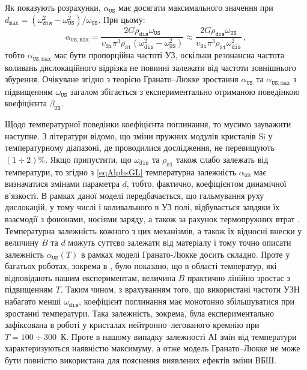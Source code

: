 Як показують розрахунки, $\alpha_\mathtt{US}$ має досягати максимального значення при
$d_\mathtt{max}=(\omega_\mathtt{dis}^2 - \omega_\mathtt{US}^2)/\omega_\mathtt{US}$.
При цьому:
\begin{equation}
\label{eqAlGLmax}
\alpha_\mathtt{US,max}=\frac{2G\rho_\mathtt{dis}\omega_\mathtt{US}}{\upsilon_\mathtt{Si}\pi^3\rho_\mathtt{Si}(\omega_\mathtt{dis}^2-\omega_\mathtt{US}^2)}
\approx\frac{2G\rho_\mathtt{dis}\omega_\mathtt{US}}{\upsilon_\mathtt{Si}\pi^3\rho_\mathtt{Si}\omega_\mathtt{dis}^2}\,,
\end{equation}
тобто $\alpha_\mathtt{US,max}$ має бути пропорційна частоті УЗ,
оскільки резонансна частота коливань дислокаційного відрізка не повинні залежати від частоти зовнішнього збурення.
Очікуване згідно з теорією Гранато--Люкке зростання $\alpha_\mathtt{US}$ та $\alpha_\mathtt{US,max}$ з підвищенням $\omega_\mathtt{US}$ загалом
збігається з експериментально отриманою поведінкою коефіцієнта $\beta_\mathtt{US}$.

Щодо температурної поведінки коефіцієнта поглинання, то мусимо зауважити наступне.
З літератури \cite{Si_C:Temp} відомо, що зміни пружних модулів кристалів Si у температурному діапазоні, де проводилися дослідження, не перевищують $(1\div2)\%$.
Якщо припустити, що $\omega_\mathtt{dis}$ та $\rho_\mathtt{Si}$ також слабо залежать від температури, то згідно з \eqref{eqAlphsGL} температурна залежність $\alpha_\mathtt{US}$ має визначатися змінами параметра $d$, тобто, фактично, коефіцієнтом динамічної в'язкості.
В рамках даної моделі передбачається, що гальмування руху дислокацій, у тому числі і коливального в УЗ полі,
відбувається завдяки їх взаємодії з фононами, носіями заряду, а також за рахунок термопружних втрат \cite{Granato,Sudz,True}.
Температурна залежність кожного з цих механізмів, а також їх відносні внески у величину $B$ та $d$ можуть суттєво залежати від матеріалу і тому точно описати залежність $\alpha_\mathtt{US}(T)$ в рамках моделі Гранато-Люкке досить складно.
Проте у багатьох роботах, зокрема в \cite{True}, було показано, що в області  температур,
які відповідають нашим експериментам, величина $B$ практично лінійно зростає з підвищенням $T$.
Таким чином, з врахуванням того, що використані частоти УЗН набагато менші $\omega_\mathtt{dis}$, коефіцієнт поглинання має монотонно збільшуватися при зростанні температури.
Така залежність, зокрема, була експериментально зафіксована в роботі \cite{YOlikh:USadsorb} у кристалах нейтронно--легованого кремнію при $T=100\div300$~К.
Проте в нашому випадку залежності АІ змін від температури характеризуються наявністю максимуму, а отже
модель Гранато--Люкке не може бути повністю використана для пояснення виявлених ефектів зміни ВБШ.

